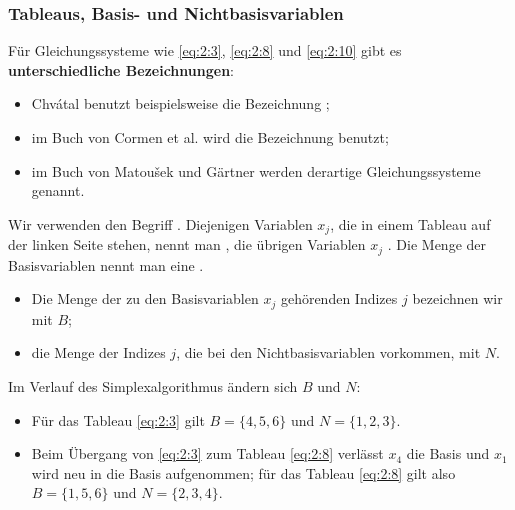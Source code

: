 \documentclass[smaller]{beamer}
\begin{document}
\begin{frame}
 \frametitle{Tableaus, Basis- und Nichtbasisvariablen}
 Für Gleichungssysteme wie \eqref{eq:2:3}, \eqref{eq:2:8} und \eqref{eq:2:10} gibt es \textbf{unterschiedliche Bezeichnungen}:
\begin{itemize}
\item Chvátal benutzt beispielsweise die Bezeichnung ;
\item im Buch von Cormen et al. wird die Bezeichnung  benutzt;
\item im Buch von Matou\v{s}ek und Gärtner werden derartige Gleichungssysteme  genannt.
\end{itemize}

Wir verwenden den Begriff . Diejenigen Variablen $x_j$, die in einem Tableau auf der linken Seite stehen, nennt man , die übrigen Variablen $x_j$ . Die Menge der Basisvariablen nennt man eine .
\begin{itemize}
\item Die Menge der zu den Basisvariablen $x_j$ gehörenden Indizes $j$ bezeichnen wir mit $B$;
\item  die Menge der Indizes $j$, die bei den Nichtbasisvariablen vorkommen, mit $N$.
\end{itemize}
Im Verlauf des Simplexalgorithmus ändern sich $B$ und $N$:
\begin{itemize}
\item Für das Tableau \eqref{eq:2:3} gilt $B = \{4, 5, 6\}$ und $N =
\{1, 2, 3\}$. 
\item Beim Übergang von \eqref{eq:2:3} zum Tableau \eqref{eq:2:8} verlässt $x_4$ die Basis und $x_1$ wird neu in die Basis aufgenommen; für das Tableau \eqref{eq:2:8} gilt also $B = \{1, 5, 6\}$ und $N = \{2, 3, 4\}$.
\end{itemize}
\end{frame}
\end{document}
